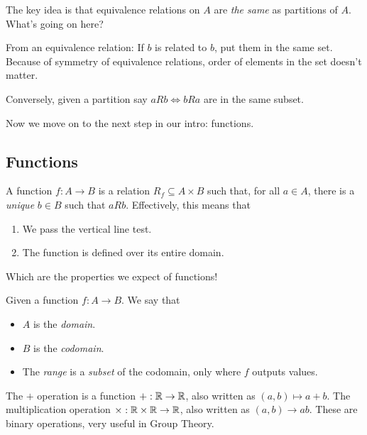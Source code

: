 \documentclass[12pt]{article}
\begin{document}
The key idea is that equivalence relations on $A$ are {\it the same} as
partitions of $A$. What's going on here?

From an equivalence relation: If $b$ is related to $b$, put them in the same
set. Because of symmetry of equivalence relations, order of elements in the
set doesn't matter.

Conversely, given a partition say $aRb \Leftrightarrow bRa$ are in the same
subset.


Now we move on to the next step in our intro: functions.

\subsection{Functions}

A function $f: A \to B$ is a relation $R_f \subseteq A \times B$ such that,
for all $a \in A$, there is a {\it unique} $b \in B$ such that $aRb$.
Effectively, this means that

\begin{enumerate}
	\item We pass the vertical line test.
	\item The function is defined over its entire domain.
\end{enumerate}

Which are the properties we expect of functions!


Given a function $f: A \to B$. We say that

\begin{itemize}
	\item $A$ is the {\it domain}.
	\item $B$ is the {\it codomain}.
	\item The {\it range} is a {\it subset} of the codomain, only where $f$
	      outputs values.
\end{itemize}

The $+$ operation is a function $+: {\mathbb R} \to {\mathbb R}$, also written as $(a, b)
	\mapsto a + b$. The multiplication operation $\times: {\mathbb R} \times {\mathbb R} \to {\mathbb R}$,
also written as $(a, b) \to ab$. These are binary operations, very useful in
Group Theory.

\end{document}
